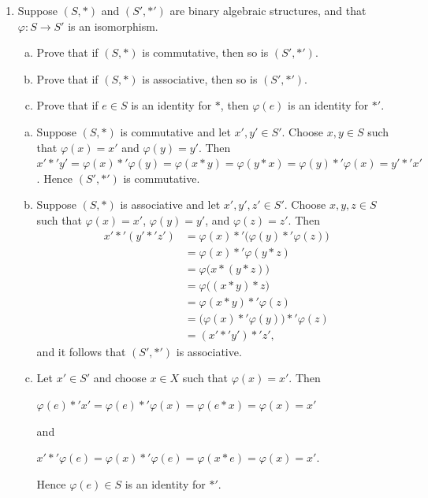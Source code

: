\documentclass[11pt,fleqn,dvipsnames,usenames]{article}
\begin{document}
\begin{enumerate}[1.]
\item Suppose $(S,*)$ and $(S',*')$ are binary algebraic structures, and that $\varphi:S\to S'$ is an isomorphism.
\begin{enumerate}[(a)]
\item Prove that if $(S,*)$ is commutative, then so is $(S',*')$.
\item Prove that if $(S,*)$ is associative, then so is $(S',*')$.
\item Prove that if $e\in S$ is an identity for $*$, then $\varphi(e)$ is an identity for $*'$.
\end{enumerate}
\vsmsp

\solution
\begin{enumerate}[(a)]
\item Suppose $(S,*)$ is commutative and let $x',y'\in S'$.  Choose $x,y\in S$ such that $\varphi(x) = x'$ and $\varphi(y) = y'$.
Then $x' *' y' = \varphi(x)*'\varphi(y) = \varphi(x*y) = \varphi(y*x) = \varphi(y)*'\varphi(x) = y'*'x'$.  Hence $(S',*')$ is commutative.
\item Suppose $(S,*)$ is associative and let $x',y',z'\in S'$.  Choose $x,y,z\in S$ such that $\varphi(x) = x'$, $\varphi(y) = y'$, and $\varphi(z) = z'$.  Then
\begin{align*}
x' *' (y'*'z') &= \varphi(x)*'\big(\varphi(y) *'\varphi(z)\big)\\
&= \varphi(x) *' \varphi(y*z)\\
&= \varphi\big(x*(y*z)\big)\\
&= \varphi\big((x*y)*z\big)\\
&= \varphi(x*y) *' \varphi(z)\\
&= \big(\varphi(x) *'\varphi(y)\big)*'\varphi(z)\\
&= (x' *' y')*'z',
\end{align*}
and it follows that $(S',*')$ is associative.
\item Let $x'\in S'$ and choose $x\in X$ such that $\varphi(x) = x'$.  Then
\begin{center}
$\varphi(e)*' x' = \varphi(e) *'\varphi(x) = \varphi(e*x) = \varphi(x) = x'$
\end{center}
and
\begin{center}
$x'*'\varphi(e) = \varphi(x)*'\varphi(e) = \varphi(x*e) = \varphi(x) = x'$.
\end{center}
Hence $\varphi(e)\in S$ is an identity for $*'$.
\end{enumerate}
\end{enumerate}
\vsp
\end{document}
